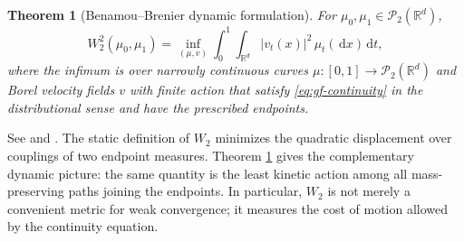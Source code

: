\documentclass[11pt]{amsart}
\numberwithin{equation}{section}
\theoremstyle{plain}
\newtheorem{theorem}{Theorem}[section]
\newcommand{\R}{\mathbb{R}}
\newcommand{\cP}{\mathcal{P}}
\newcommand{\dd}{\,\mathrm{d}}
\newcommand{\abs}[1]{\left\lvert#1\right\rvert}
\begin{document}
\begin{theorem}[Benamou--Brenier dynamic formulation]
\label{thm:benamou-brenier}
For $\mu_0,\mu_1\in\cP_2(\R^d)$,
\begin{equation}\label{eq:benamou-brenier}
 W_2^2(\mu_0,\mu_1)
 =\inf_{(\mu,v)}
   \int_0^1\int_{\R^d}\abs{v_t(x)}^2\,\mu_t(\dd x)\dd t,
\end{equation}
where the infimum is over narrowly continuous curves
$\mu:[0,1]\to\cP_2(\R^d)$ and Borel velocity fields $v$ with finite action
that satisfy \eqref{eq:gf-continuity} in the distributional sense and have
the prescribed endpoints.
\end{theorem}

See \cite{BenamouBrenier2000} and
\cite[Chapter~7]{Villani2009}.  The static definition of $W_2$ minimizes the
quadratic displacement over couplings of two endpoint measures.  Theorem
\ref{thm:benamou-brenier} gives the complementary dynamic picture: the same
quantity is the least kinetic action among all mass-preserving paths joining
the endpoints.  In particular, $W_2$ is not merely a convenient metric for
weak convergence; it measures the cost of motion allowed by the continuity
equation.


\vspace{2mm}
\end{document}
